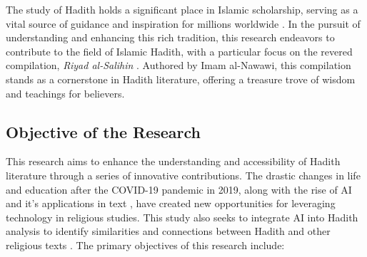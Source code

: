 \documentclass{svproc}
\begin{document}

The study of Hadith holds a significant place in Islamic scholarship, serving as a vital source of guidance and inspiration for millions worldwide \cite{what_hadith_is}. In the pursuit of understanding and enhancing this rich tradition, this research endeavors to contribute to the field of Islamic Hadith, with a particular focus on the revered compilation, \textit{Riyad al-Salihin} \cite{what_hadith_is}. Authored by Imam al-Nawawi, this compilation stands as a cornerstone in Hadith literature, offering a treasure trove of wisdom and teachings for believers.

\subsection{Objective of the Research}

This research aims to enhance the understanding and accessibility of Hadith literature through a series of innovative contributions. The drastic changes in life and education after the COVID-19 pandemic in 2019, along with the rise of AI \cite{Mazzara2022} and it's applications in text \cite{10062863}, have created new opportunities for leveraging technology in religious studies. This study also seeks to integrate AI into Hadith analysis to identify similarities and connections between Hadith and other religious texts \cite{Altammami2023}. The primary objectives of this research include:
\end{document}
